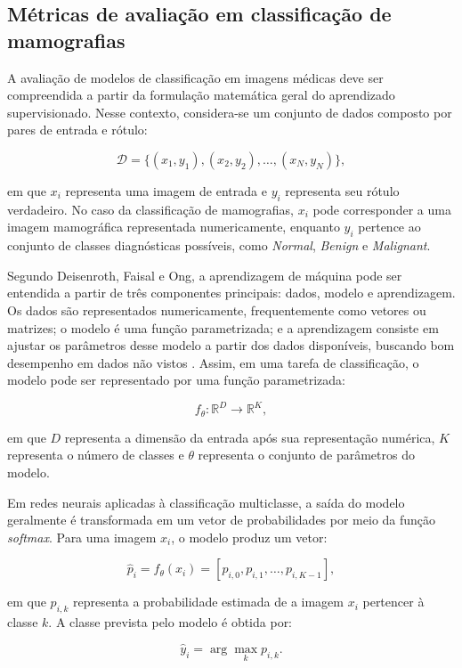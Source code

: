 \documentclass[
    12pt,
    openright,
    oneside,
    a4paper,
    english,
    brazil
]{abntex2}
\begin{document}
\subsection{Métricas de avaliação em classificação de mamografias}
\label{subsec:metricas_avaliacao}

A avaliação de modelos de classificação em imagens médicas deve ser compreendida a partir da formulação matemática geral do aprendizado supervisionado. Nesse contexto, considera-se um conjunto de dados composto por pares de entrada e rótulo:

\[
\mathcal{D} = \{(x_1,y_1),(x_2,y_2),\ldots,(x_N,y_N)\},
\]

em que \(x_i\) representa uma imagem de entrada e \(y_i\) representa seu rótulo verdadeiro. No caso da classificação de mamografias, \(x_i\) pode corresponder a uma imagem mamográfica representada numericamente, enquanto \(y_i\) pertence ao conjunto de classes diagnósticas possíveis, como \textit{Normal}, \textit{Benign} e \textit{Malignant}.

Segundo Deisenroth, Faisal e Ong, a aprendizagem de máquina pode ser entendida a partir de três componentes principais: dados, modelo e aprendizagem. Os dados são representados numericamente, frequentemente como vetores ou matrizes; o modelo é uma função parametrizada; e a aprendizagem consiste em ajustar os parâmetros desse modelo a partir dos dados disponíveis, buscando bom desempenho em dados não vistos \cite{deisenroth2020mathematics}. Assim, em uma tarefa de classificação, o modelo pode ser representado por uma função parametrizada:

\[
f_{\theta}: \mathbb{R}^{D} \rightarrow \mathbb{R}^{K},
\]

em que \(D\) representa a dimensão da entrada após sua representação numérica, \(K\) representa o número de classes e \(\theta\) representa o conjunto de parâmetros do modelo.

Em redes neurais aplicadas à classificação multiclasse, a saída do modelo geralmente é transformada em um vetor de probabilidades por meio da função \textit{softmax}. Para uma imagem \(x_i\), o modelo produz um vetor:

\[
\hat{p}_i = f_{\theta}(x_i) = [p_{i,0}, p_{i,1}, \ldots, p_{i,K-1}],
\]

em que \(p_{i,k}\) representa a probabilidade estimada de a imagem \(x_i\) pertencer à classe \(k\). A classe prevista pelo modelo é obtida por:

\[
\hat{y}_i = \arg\max_{k} p_{i,k}.
\]
\end{document}
